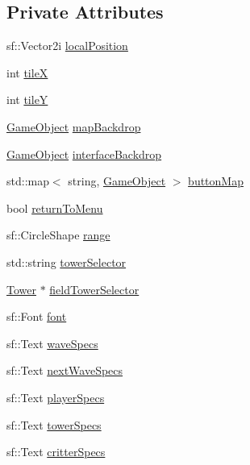 \subsection*{Private Attributes}
\begin{DoxyCompactItemize}
\item 
sf\+::\+Vector2i \hyperlink{class_game_state_play_aef4648e9978d2b031365686fa5221038}{local\+Position}
\item 
int \hyperlink{class_game_state_play_a6c82bd77433f30b20a88e19ab37a7f96}{tile\+X}
\item 
int \hyperlink{class_game_state_play_ae34c6aa315832bd457df59720345534e}{tile\+Y}
\item 
\hyperlink{class_game_object}{Game\+Object} \hyperlink{class_game_state_play_a1114fc8f3e15f5f46ab4361dad37ad0b}{map\+Backdrop}
\item 
\hyperlink{class_game_object}{Game\+Object} \hyperlink{class_game_state_play_a153cd0b94e19f3c0fab378c716678f60}{interface\+Backdrop}
\item 
std\+::map$<$ string, \hyperlink{class_game_object}{Game\+Object} $>$ \hyperlink{class_game_state_play_ab0755d9a7eb5708a840d82bbdc7eb9f2}{button\+Map}
\item 
bool \hyperlink{class_game_state_play_a6f5a18b6d0597c0f6c4d26b4df873ee6}{return\+To\+Menu}
\item 
sf\+::\+Circle\+Shape \hyperlink{class_game_state_play_a4ac9c1b314dfbfe0082728eacfc401fc}{range}
\item 
std\+::string \hyperlink{class_game_state_play_acfd6271509da5b9cec7ed2904b3ad33a}{tower\+Selector}
\item 
\hyperlink{class_tower}{Tower} $\ast$ \hyperlink{class_game_state_play_af37399cc10da66842740622a891489e0}{field\+Tower\+Selector}
\item 
sf\+::\+Font \hyperlink{class_game_state_play_a333494e6c4a8ae4a285635776c3b486e}{font}
\item 
sf\+::\+Text \hyperlink{class_game_state_play_a61669dc94331d0302f3a0f5792304049}{wave\+Specs}
\item 
sf\+::\+Text \hyperlink{class_game_state_play_afee193abc64a41d61a08db7d6d5b507d}{next\+Wave\+Specs}
\item 
sf\+::\+Text \hyperlink{class_game_state_play_a5e7f3929ab226b4ad0fb627d3c779f84}{player\+Specs}
\item 
sf\+::\+Text \hyperlink{class_game_state_play_add98cf58c2cc6af809cade72be6c6c0a}{tower\+Specs}
\item 
sf\+::\+Text \hyperlink{class_game_state_play_a1667ea17be43ded7176a9dc28d99a8e1}{critter\+Specs}

\end{DoxyCompactItemize}
